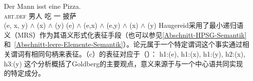 \begin{exe}
\begin{xlist}[iv.]
\begin{exe}
\begin{xlist}[iv.]
\eal
\ex 
\gll Der Mann isst eine Pizza.\\
	 \textsc{art}.\textsc{def} 男人 吃 一 披萨\\
\ex {}(e, x, y) $\wedge$ (x) $\wedge$ (y)
\ex {}(e) $\wedge$ (e,x) $\wedge$ (e,y) $\wedge$ (x) $\wedge$ (y)
\zl
Haugereid采用了最小递归语义（MRS）\indexmrs 作为其语义形式化表征手段（也可以参见\ref{Abschnitt-HPSG-Semantik}和~\ref{Abschnitt-leere-Elemente-Semantik}）。论元属于一个特定谓词这个事实通过相关谓词有相同句柄来表征。（c）的表征对应于（）：
\ea
h1:(e), h1:(x), h1:(y), h2:(x), h3:(y)
\z
这个分析概括了Goldberg的主要观点，意义来源于与一个中心语共同实现的特定成分。


\end{xlist}
\end{exe}
\end{xlist}
\end{exe}
